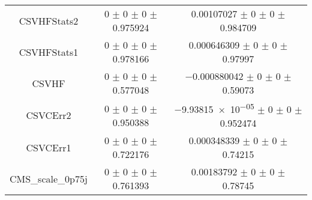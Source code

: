 \begin{table}
\begin{tabular}{ccc}
CSVHFStats2 & \num{0} $\pm$ \num{0} $\pm$ \num{0} $\pm$ \num{0.975924} & \num{0.00107027} $\pm$ \num{0} $\pm$ \num{0} $\pm$ \num{0.984709}\\
CSVHFStats1 & \num{0} $\pm$ \num{0} $\pm$ \num{0} $\pm$ \num{0.978166} & \num{0.000646309} $\pm$ \num{0} $\pm$ \num{0} $\pm$ \num{0.97997}\\
CSVHF & \num{0} $\pm$ \num{0} $\pm$ \num{0} $\pm$ \num{0.577048} & \num{-0.000880042} $\pm$ \num{0} $\pm$ \num{0} $\pm$ \num{0.59073}\\
CSVCErr2 & \num{0} $\pm$ \num{0} $\pm$ \num{0} $\pm$ \num{0.950388} & \num{-9.93815e-05} $\pm$ \num{0} $\pm$ \num{0} $\pm$ \num{0.952474}\\
CSVCErr1 & \num{0} $\pm$ \num{0} $\pm$ \num{0} $\pm$ \num{0.722176} & \num{0.000348339} $\pm$ \num{0} $\pm$ \num{0} $\pm$ \num{0.74215}\\
CMS\_scale\_0p75j & \num{0} $\pm$ \num{0} $\pm$ \num{0} $\pm$ \num{0.761393} & \num{0.00183792} $\pm$ \num{0} $\pm$ \num{0} $\pm$ \num{0.78745}\\
\bottomrule
\end{tabular}
\end{table}